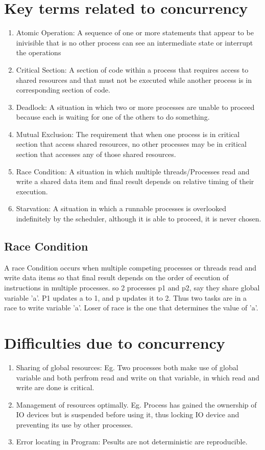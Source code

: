 \documentclass[11pt]{article}
\begin{document}
\section{Key terms related to concurrency}

\begin{enumerate}
	\item Atomic Operation: A sequence of one or more statements that appear to be inivisible that is no other process can see an intermediate state or interrupt the operations
	\item Critical Section: A section of code within a process that requires access to shared resources and that must not be executed while another process is in corresponding section of code.
	\item Deadlock: A situation in which two or more processes are unable to proceed because each is waiting for one of the others to do something.
	\item Mutual Exclusion: The requirement that when one process is in critical section that access shared resources, no other processes may be in critical section that accesses any of those shared resources.
	\item Race Condition: A situation in which multiple threads/Processes read and write a shared data item and final result depends on relative timing of their execution.
	\item Starvation: A situation in which a runnable processes is overlooked indefinitely by the scheduler, although it is able to proceed, it is never chosen.
\end{enumerate}

\subsection{Race Condition}
A race Condition occurs when multiple competing processes or threads read and write data items so that final result depends on the order of eecution of instructions in multiple processes. so 2 processes p1 and p2, say they share global variable 'a'. P1 updates a to 1, and p updates it to 2. Thus two tasks are in a race to write variable 'a'. Loser of race is the one that determines the value of 'a'.

\section{Difficulties due to concurrency}
\begin{enumerate}
	\item Sharing of global resources: Eg. Two processes both make use of global variable and both perfrom read and write on that variable, in which read and write are done is critical.
	\item Management of resources optimally. Eg. Process has gained the ownership of IO devices but is suspended before using it, thus locking IO device and preventing its use by other processes.
	\item Error locating in Program: Pesults are not deterministic are reproducible.
\end{enumerate}
\end{document}
